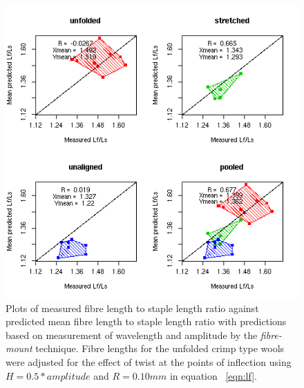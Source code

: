 %

\begin{figure}[!h]
  \centering
  \includegraphics[width=1.1\textwidth]{figfcpredlfr.png}
  \caption{Plots of measured fibre length to staple length ratio against predicted mean fibre length to staple length ratio with predictions based on measurement of wavelength and amplitude by the {\em fibre-mount} technique. Fibre lengths for the unfolded crimp type wools were adjusted for the effect of twist at the points of inflection using $H = 0.5 * amplitude$ and $R = 0.10 mm$ in equation ~\ref{eqn:lf}.}
  \label{fig:fcpredlfr}
\end{figure}

%

